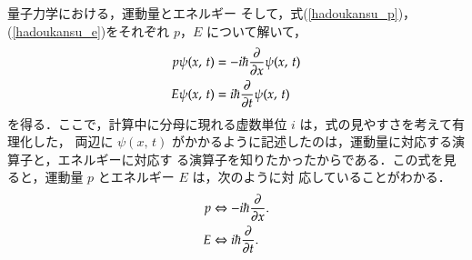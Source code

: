 \begin{mysmallsec}{量子力学における，運動量とエネルギー}
            そして，式(\ref{hadoukansu_p})，(\ref{hadoukansu_e})をそれぞれ $p$，$E$ について解いて，
                \begin{align*}
                    p\psi(x,\,t) &= -i\hbar\frac{\partial }{\partial x}\psi(x,\,t) \\
                    E\psi(x,\,t) &=  i\hbar\frac{\partial }{\partial t}\psi(x,\,t)
                \end{align*}
            を得る．ここで，計算中に分母に現れる虚数単位 $i$ は，式の見やすさを考えて有理化した，
            両辺に $\psi(x,\,t)$ がかかるように記述したのは，運動量に対応する演算子と，エネルギーに対応す
            る演算子を知りたかったからである．この式を見ると，運動量 $p$ とエネルギー $E$ は，次のように対
            応していることがわかる．
                \begin{align}
                    p &\Leftrightarrow  -i\hbar\frac{\partial }{\partial x}. \\
                    E &\Leftrightarrow   i\hbar\frac{\partial }{\partial t}.
                \end{align}
            \end{mysmallsec}

